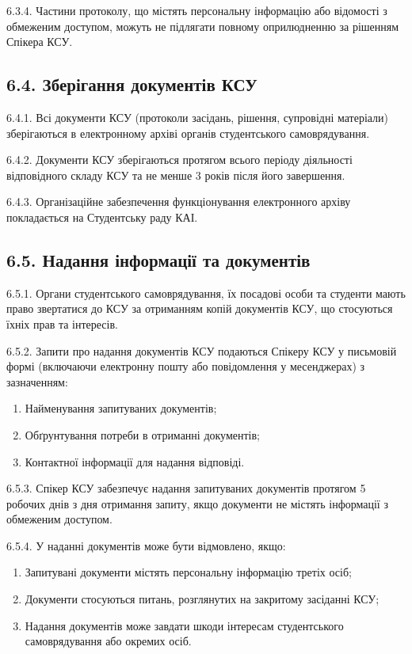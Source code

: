     6.3.4. Частини протоколу, що містять персональну інформацію або відомості з обмеженим доступом, можуть не підлягати повному оприлюдненню за рішенням Спікера КСУ.

\subsection*{6.4. Зберігання документів КСУ}
    6.4.1. Всі документи КСУ (протоколи засідань, рішення, супровідні матеріали) зберігаються в електронному архіві органів студентського самоврядування.

    6.4.2. Документи КСУ зберігаються протягом всього періоду діяльності відповідного складу КСУ та не менше 3 років після його завершення.

    6.4.3. Організаційне забезпечення функціонування електронного архіву покладається на Студентську раду КАІ.

\subsection*{6.5. Надання інформації та документів}
    6.5.1. Органи студентського самоврядування, їх посадові особи та студенти мають право звертатися до КСУ за отриманням копій документів КСУ, що стосуються їхніх прав та інтересів.

    6.5.2. Запити про надання документів КСУ подаються Спікеру КСУ у письмовій формі (включаючи електронну пошту або повідомлення у месенджерах) з зазначенням:

        \begin{enumerate}[label=\alph*)]
            \item Найменування запитуваних документів;
            \item Обґрунтування потреби в отриманні документів;
            \item Контактної інформації для надання відповіді.
        \end{enumerate}

    6.5.3. Спікер КСУ забезпечує надання запитуваних документів протягом 5 робочих днів з дня отримання запиту, якщо документи не містять інформації з обмеженим доступом.

    6.5.4. У наданні документів може бути відмовлено, якщо:

        \begin{enumerate}[label=\alph*)]
            \item Запитувані документи містять персональну інформацію третіх осіб;
            \item Документи стосуються питань, розглянутих на закритому засіданні КСУ;
            \item Надання документів може завдати шкоди інтересам студентського самоврядування або окремих осіб.
        \end{enumerate}

